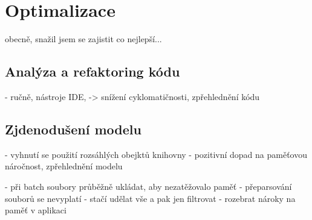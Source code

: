 \section{Optimalizace}

	obecně, snažil jsem se zajistit co nejlepší...

 \subsection{Analýza a refaktoring kódu}
  	- ručně, nástroje IDE, -> snížení cyklomatičnosti, zpřehlednění kódu
  	
 \subsection{Zjdenodušení modelu} 
 	- vyhnutí se použití rozsáhlých obejktů knihovny
 	- pozitivní dopad na paměťovou náročnost, zpřehlednění modelu

 - při batch soubory průběžně ukládat, aby nezatěžovalo paměť
 - přeparsování souborů se nevyplatí - stačí udělat vše a pak jen filtrovat 
 - rozebrat nároky na paměť v aplikaci
